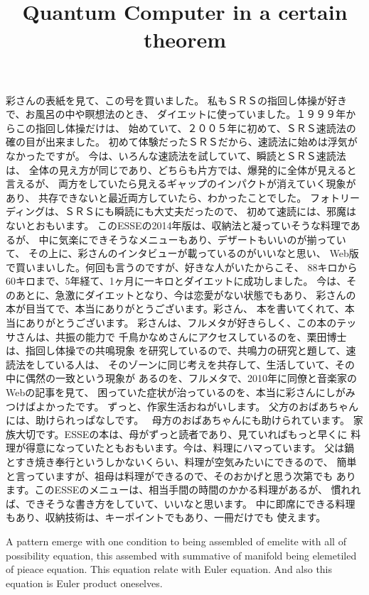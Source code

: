 \documentclass{jsarticle}
\begin{document}
\title{}
\author{}
\date{}
\maketitle


   彩さんの表紙を見て、この号を買いました。
私もＳＲＳの指回し体操が好きで、お風呂の中や瞑想法のとき、
ダイエットに使っていました。１９９９年からこの指回し体操だけは、
始めていて、２００５年に初めて、ＳＲＳ速読法の確の目が出来ました。
初めて体験だったＳＲＳだから、速読法に始めは浮気がなかったですが。
今は、いろんな速読法を試していて、瞬読とＳＲＳ速読法は、
全体の見え方が同じであり、どちらも片方では、爆発的に全体が見えると言えるが、 
両方をしていたら見えるギャップのインパクトが消えていく現象があり、
共存できないと最近両方していたら、わかったことでした。
フォトリーディングは、ＳＲＳにも瞬読にも大丈夫だったので、
初めて速読には、邪魔はないとおもいます。
このESSEの2014年版は、収納法と凝っていそうな料理であるが、
中に気楽にできそうなメニューもあり、デザートもいいのが揃っていて、
その上に、彩さんのインタビューが載っているのがいいなと思い、
Web版で買いまいした。何回も言うのですが、好きな人がいたからこそ、
88キロから60キロまで、5年経て、1ヶ月に一キロとダイエットに成功しました。
今は、そのあとに、急激にダイエットとなり、今は恋愛がない状態でもあり、
彩さんの本が目当てで、本当にありがとうございます。彩さん、
本を書いてくれて、本当にありがとうございます。
彩さんは、フルメタが好きらしく、この本のテッサさんは、共振の能力で
千鳥かなめさんにアクセスしているのを、栗田博士は、指回し体操での共鳴現象
を研究しているので、共鳴力の研究と題して、速読法をしている人は、
そのゾーンに同じ考えを共存して、生活していて、その中に偶然の一致という現象が
あるのを、フルメタで、2010年に同僚と音楽家のWebの記事を見て、
困っていた症状が治っているのを、本当に彩さんにしがみつけばよかったです。
ずっと、作家生活おねがいします。
父方のおばあちゃんには、助けられっぱなしです。　
母方のおばあちゃんにも助けられています。
家族大切です。ESSEの本は、母がずっと読者であり、見ていればもっと早くに
料理が得意になっていたともおもいます。今は、料理にハマっています。
父は鍋とすき焼き奉行というしかないくらい、料理が空気みたいにできるので、
簡単と言っていますが、祖母は料理ができるので、そのおかげと思う次第でも
あります。このESSEのメニューは、相当手間の時間のかかる料理があるが、
慣れれば、できそうな書き方をしていて、いいなと思います。
中に即席にできる料理もあり、収納技術は、キーポイントでもあり、一冊だけでも
使えます。


\title{Quantum Computer in a certain theorem}


A pattern emerge with one condition to being assembled of emelite with all of possibility equation,
this assembed with summative of manifold being elemetiled of pieace equation. This equation relate with Euler equation.
And also this equation is Euler product oneselves.
\end{document}
